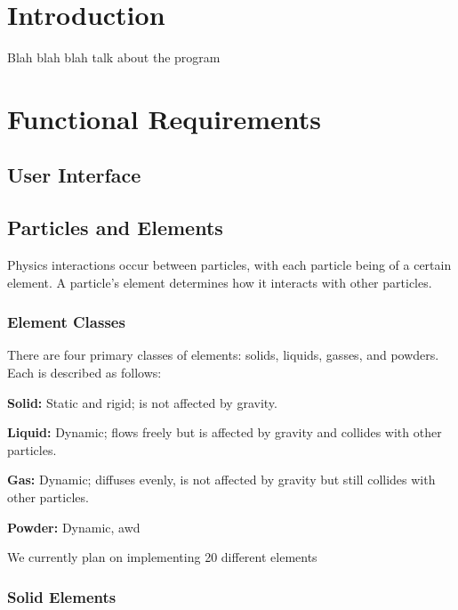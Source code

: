 \documentclass[12pt]{article}
\begin{document}
    \pagestyle{fancy}


    \section{Introduction}

    Blah blah blah talk about the program

    \section{Functional Requirements}

    \subsection{User Interface}

    \subsection{Particles and Elements}
    
    Physics interactions occur between particles, with each particle being of a
    certain element.
    A particle's element determines how it interacts with other particles.
    
    \subsubsection{Element Classes}

    There are four primary classes of elements: solids, liquids, gasses, and powders.
    Each is described as follows:

    \textbf{Solid:} Static and rigid; is not affected by gravity.

    \textbf{Liquid:} Dynamic; flows freely but is affected by gravity and
    collides with other particles.
    
    \textbf{Gas:} Dynamic; diffuses evenly, is not affected by gravity but still
    collides with other particles.

    \textbf{Powder:} Dynamic, awd

    We currently plan on implementing 20 different elements

    \subsubsection{Solid Elements}
\end{document}
